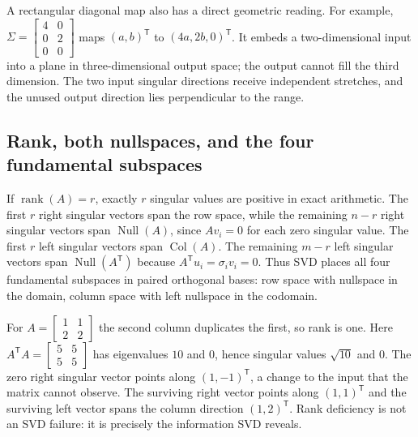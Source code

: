 A rectangular diagonal map also has a direct geometric reading. For example, \(\Sigma=\begin{bmatrix}4&0\\0&2\\0&0\end{bmatrix}\) maps \((a,b)^\mathsf T\) to \((4a,2b,0)^\mathsf T\). It embeds a two-dimensional input into a plane in three-dimensional output space; the output cannot fill the third dimension. The two input singular directions receive independent stretches, and the unused output direction lies perpendicular to the range.

\subsection{Rank, both nullspaces, and the four fundamental subspaces}\label{02-foundations-ii-ch024-rank-both-nullspaces-and-the-four-fundamental-subspaces}

\hypertarget{02-foundations-ii-ch024-rank-both-nullspaces-and-the-four-fundamental-subspaces}{}

If \(\operatorname{rank}(A)=r\), exactly \(r\) singular values are positive in exact arithmetic. The first \(r\) right singular vectors span the row space, while the remaining \(n-r\) right singular vectors span \(\operatorname{Null}(A)\), since \(Av_i=0\) for each zero singular value. The first \(r\) left singular vectors span \(\operatorname{Col}(A)\). The remaining \(m-r\) left singular vectors span \(\operatorname{Null}(A^\mathsf T)\) because \(A^\mathsf T u_i=\sigma_i v_i=0\). Thus SVD places all four fundamental subspaces in paired orthogonal bases: row space with nullspace in the domain, column space with left nullspace in the codomain.

For \(A=\begin{bmatrix}1&1\\2&2\end{bmatrix}\) the second column duplicates the first, so rank is one. Here \(A^\mathsf T A=\begin{bmatrix}5&5\\5&5\end{bmatrix}\) has eigenvalues \(10\) and \(0\), hence singular values \(\sqrt{10}\) and \(0\). The zero right singular vector points along \((1,-1)^\mathsf T\), a change to the input that the matrix cannot observe. The surviving right vector points along \((1,1)^\mathsf T\) and the surviving left vector spans the column direction \((1,2)^\mathsf T\). Rank deficiency is not an SVD failure: it is precisely the information SVD reveals.

